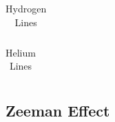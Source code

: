 \documentclass[11pt,a4paper]{article}
\begin{document}
    \begin{table}[H]
        \center
        \caption{Hydrogen Lines}
        \begin{tabular}{ l l l l}
        
        \end{tabular}
        \label{tab:hydrogen}
    \end{table}

    \begin{table}[H]
        \center
        \caption{Helium Lines}
        \begin{tabular}{ l l l l}
            
        \end{tabular}
        \label{tab:helium}
    \end{table}

    \subsection{\label{subsect:res_Zeeman}Zeeman Effect}
\end{document}
